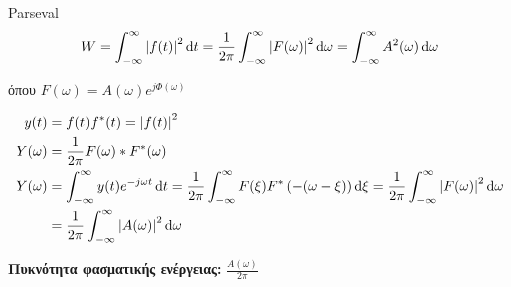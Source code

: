     \begin{theorem*}[title=Θεώρημα Parseval,width=.8\textwidth]{Parseval}
        \begin{align*}
        W = \int_{-\infty}^{\infty} \left| f(t) \right|^2\mathop{}\!\mathrm{d} t
        =\frac{1}{2\pi}\int_{-\infty}^{\infty} \left|F(\omega )\right|^2
        \mathop{}\!\mathrm{d} \omega = \int_{-\infty}^{\infty} A^2(\omega )\mathop{}\!\mathrm{d} \omega
        \end{align*}

        όπου \( \displaystyle F(\omega ) = A(\omega )e^{j\varPhi(\omega )} \)
     \end{theorem*}

     \begin{align*}
     y(t) &= f(t)f^*(t)=\left|f(t)\right|^2 \\
     Y(\omega ) &= \frac{1}{2\pi} F(\omega )*F^*(\omega ) \\
     Y(\omega ) &= \int_{-\infty}^{\infty} y(t)e^{-j\omega t}\mathop{}\!\mathrm{d} t
     = \frac{1}{2\pi} \int_{-\infty}^{\infty} F(\xi) F^*\left(
     -(\omega -\xi) \right)\mathop{}\!\mathrm{d} \xi
     = \frac{1}{2\pi}\int_{-\infty}^{\infty} \left|F(\omega )\right|^2\mathop{}\!\mathrm{d} \omega
     \\ &= \frac{1}{2\pi}\int_{-\infty}^{\infty} \left|A(\omega )\right|^2\mathop{}\!\mathrm{d}\omega
     \end{align*}

     \begin{defn*}{}
        \textbf{Πυκνότητα φασματικής ενέργειας:}
        \(\displaystyle
        \frac{A(\omega)}{2\pi}
        \)
     \end{defn*}


